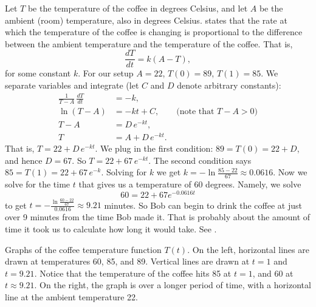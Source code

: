 \begin{exampleSol}
Let $T$ be the temperature of the coffee in degrees Celsius, and let $A$ be
the ambient (room) temperature, also in degrees Celsius.
 states that the rate at which the
temperature of the coffee is changing
is proportional to the difference between the
ambient temperature and the temperature of the coffee.  That is,
\begin{equation*}
\frac{dT}{dt} = k(A-T) ,
\end{equation*}
for some constant $k$.
For our setup $A=22$, $T(0) = 89$, $T(1) = 85$.
We separate variables and integrate (let $C$ and $D$ denote arbitrary
constants):
\begin{align*}
\frac{1}{T-A} \, \frac{dT}{dt} & = -k , \\
\ln (T-A) &= -kt + C , \qquad \text{(note that } T-A > 0 \text{)} \\
T-A &= D\, e^{-kt} ,  \\
T &= A + D\, e^{-kt} .
\end{align*}
That is,
$T = 22 + D\, e^{-kt}$.  We plug in the first condition: $89 = T(0) = 22 +
D$,
and hence $D = 67$.  So
$T = 22 + 67\, e^{-kt}$.  The second condition says $85 = T(1) = 
22 + 67\, e^{-k}$.  Solving for $k$ we get
$k = - \ln \frac{85-22}{67} \approx 0.0616$.  Now we solve for the time $t$
that gives us a temperature of 60 degrees.  Namely, we solve
\begin{equation*}
60 = 22 + 67 e^{-0.0616t}
\end{equation*}
to get
$t = - \frac{\ln \frac{60-22}{67}}{0.0616} \approx 9.21$ minutes.  So Bob can
begin to drink the coffee at just over 9 minutes from the time Bob made
it.  That is probably about the amount of time it took us to calculate how long
it would take.  See .
\begin{myfig}
\capstart
\caption{Graphs of the coffee temperature function $T(t)$.
On the left, horizontal
lines are drawn at temperatures 60, 85, and 89.  Vertical lines
are drawn at $t=1$ and $t=9.21$.  Notice that the
temperature of the coffee hits 85 at $t=1$, and 60 at
$t \approx 9.21$.  On the right, the graph is over a longer period of time,
with a horizontal line at the ambient temperature 22.\label{sintro:coffeefig}}
\end{myfig}
\end{exampleSol}

\newpage

